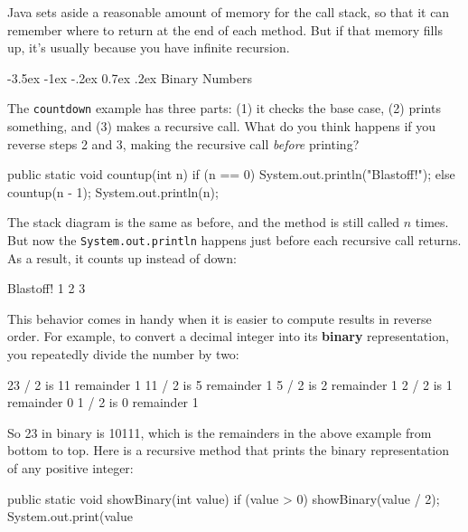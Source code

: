 \documentclass[12pt]{book}
\makeatletter
\theoremstyle{exercise}
\newcommand{\java}[1]{\verb"#1"}
\renewcommand{\section}{\@startsection {section}{1}{\z@}%
    {-3.5ex \@plus -1ex \@minus -.2ex}%
    {0.7ex \@plus.2ex}%
    {\normalfont\Large\bfseries}}
\newcommand{\java}[1]{\lstinline{#1}} %
\makeatother
\begin{document}
Java sets aside a reasonable amount of memory for the call stack, so that it can remember where to return at the end of each method.
But if that memory fills up, it's usually because you have infinite recursion.



\section{Binary Numbers}

The \java{countdown} example has three parts: (1) it checks the base case, (2) prints something, and (3) makes a recursive call.
What do you think happens if you reverse steps 2 and 3, making the recursive call {\it before} printing?

\begin{code}
    public static void countup(int n) {
        if (n == 0) {
            System.out.println("Blastoff!");
        } else {
            countup(n - 1);
            System.out.println(n);
        }
    }
\end{code}

The stack diagram is the same as before, and the method is still called $n$ times.
But now the \java{System.out.println} happens just before each recursive call returns.
As a result, it counts up instead of down:

\begin{stdout}
Blastoff!
1
2
3
\end{stdout}

This behavior comes in handy when it is easier to compute results in reverse order.
For example, to convert a decimal integer into its {\bf binary} representation, you repeatedly divide the number by two:

\begin{stdout}
23 / 2 is 11 remainder 1
11 / 2 is  5 remainder 1
 5 / 2 is  2 remainder 1
 2 / 2 is  1 remainder 0
 1 / 2 is  0 remainder 1
\end{stdout}

So 23 in binary is 10111, which is the remainders in the above example from bottom to top.
Here is a recursive method that prints the binary representation of any positive integer:

\begin{code}
    public static void showBinary(int value) {
        if (value > 0) {
            showBinary(value / 2);
            System.out.print(value %
        }
    }
\end{code}
\end{document}
